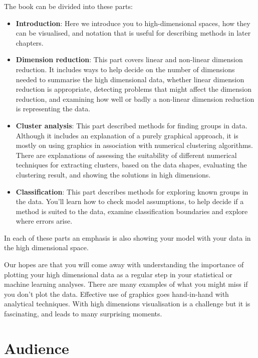 \documentclass[
  letterpaper,
]{krantz}
\providecommand{\tightlist}{%
  \setlength{\itemsep}{0pt}\setlength{\parskip}{0pt}}
\begin{document}
The book can be divided into these parts:

\begin{itemize}
\tightlist
\item
  \textbf{Introduction}: Here we introduce you to high-dimensional
  spaces, how they can be visualised, and notation that is useful for
  describing methods in later chapters.\\
\item
  \textbf{Dimension reduction}: This part covers linear and non-linear
  dimension reduction. It includes ways to help decide on the number of
  dimensions needed to summarise the high dimensional data, whether
  linear dimension reduction is appropriate, detecting problems that
  might affect the dimension reduction, and examining how well or badly
  a non-linear dimension reduction is representing the data.
\item
  \textbf{Cluster analysis}: This part described methods for finding
  groups in data. Although it includes an explanation of a purely
  graphical approach, it is mostly on using graphics in association with
  numerical clustering algorithms. There are explanations of assessing
  the suitability of different numerical techniques for extracting
  clusters, based on the data shapes, evaluating the clustering result,
  and showing the solutions in high dimensions.
\item
  \textbf{Classification}: This part describes methods for exploring
  known groups in the data. You'll learn how to check model assumptions,
  to help decide if a method is suited to the data, examine
  classification boundaries and explore where errors arise.
\end{itemize}

In each of these parts an emphasis is also showing your model with your
data in the high dimensional space.

Our hopes are that you will come away with understanding the importance
of plotting your high dimensional data as a regular step in your
statistical or machine learning analyses. There are many examples of
what you might miss if you don't plot the data. Effective use of
graphics goes hand-in-hand with analytical techniques. With high
dimensions visualisation is a challenge but it is fascinating, and leads
to many surprising moments.

\section*{Audience}\label{audience}
\end{document}
